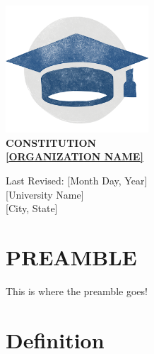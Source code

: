 \documentclass[12pt,letterpaper]{article}
\begin{document}
\renewcommand{\labelitemi}{\textcolor{accent}{\ding{68}}}
\renewcommand{\labelitemii}{\textcolor{accent}{\ding{67}}}
\renewcommand{\labelitemiii}{\textcolor{accent}{\ding{66}}}

\renewcommand{\labelenumi}{\textcolor{accent}{\alph*.}}

\begin{titlepage}
\begin{center}
\vspace*{1cm}

\includegraphics[width=0.4\textwidth]{logo.png}\\[2cm]

{\LARGE\bfseries\color{accent} CONSTITUTION\\[0.5cm]}
{\huge\bfseries\color{accent} \underline{[ORGANIZATION NAME]}\\[1cm]}

{\large Last Revised: [Month Day, Year]}\\[3cm]

\vfill
{\large [University Name]}\\
{\large [City, State]}\\[1cm]
\end{center}
\end{titlepage}

\tableofcontents
\clearpage

\section*{PREAMBLE}

\begin{hangparas}{0.5in}{1}
  This is where the preamble goes!
\end{hangparas}

\section{Definition}
\end{document}
